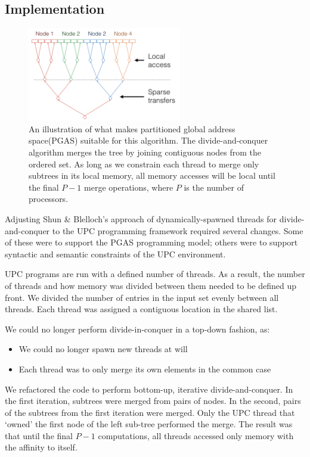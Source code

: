 \documentclass[10pt]{article}
\begin{document}
\subsection{Implementation}

\begin{figure}
\centering
\includegraphics[width=0.6\textwidth]{figures/architecture}
\caption{%
An illustration of what makes partitioned global address space(PGAS) suitable for this algorithm.
The divide-and-conquer algorithm merges the tree by joining contiguous nodes from the ordered set.
As long as we constrain each thread to merge only subtrees in its local memory, all memory accesses will be local until the final $P - 1$ merge operations, where $P$ is the number of processors.
}
\label{fig:architecture}
\end{figure}

Adjusting Shun \& Blelloch's approach of dynamically-spawned threads for divide-and-conquer to
the UPC programming framework required several changes.
Some of these were to support the PGAS programming model;
others were to support syntactic and semantic constraints of the UPC environment.

UPC programs are run with a defined number of threads.
As a result, the number of threads and how memory was divided between them needed to be defined
up front.
We divided the number of entries in the input set evenly between all threads.
Each thread was assigned a contiguous location in the shared list.

We could no longer perform divide-in-conquer in a top-down fashion, as:
\begin{itemize}[noitemsep]
  \item We could no longer spawn new threads at will
  \item Each thread was to only merge its own elements in the common case
\end{itemize}
We refactored the code to perform bottom-up, iterative divide-and-conquer.
In the first iteration, subtrees were merged from pairs of nodes.
In the second, pairs of the subtrees from the first iteration were merged.
Only the UPC thread that `owned' the first node of the left sub-tree performed the merge.
The result was that until the final $P - 1$ computations, all threads accessed only memory with
the affinity to itself.
\end{document}
